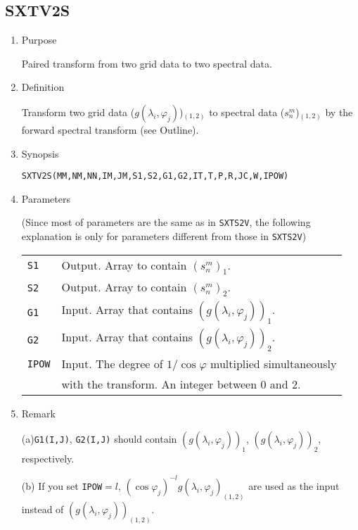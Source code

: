\documentclass[a4paper]{scrartcl}
\begin{document}

\subsection{SXTV2S}

\begin{enumerate}

\item Purpose

Paired transform from two grid data to two spectral data.
  
\item Definition

Transform two grid data ($g(\lambda_i,\varphi_j)$)$_{(1,2)}$ 
to spectral data ($s^m_n$)$_{(1,2)}$ 
by the forward spectral transform (see Outline).

\item Synopsis 

\texttt{SXTV2S(MM,NM,NN,IM,JM,S1,S2,G1,G2,IT,T,P,R,JC,W,IPOW)}
  

\item Parameters

(Since most of parameters are the same as in \texttt{SXTS2V},
the following explanation is only for parameters
different from those in \texttt{SXTS2V})

\begin{tabular}{ll}
\texttt{S1} & Output. Array to contain $(s^m_n)_1$.\\
\texttt{S2} & Output. Array to contain $(s^m_n)_2$.\\  
\texttt{G1} & Input. Array that 
contains $(g(\lambda_i,\varphi_j))_1$.\\
\texttt{G2} & Input. Array that 
contains $(g(\lambda_i,\varphi_j))_2$.\\
\texttt{IPOW} & Input. 
The degree of $1/\cos\varphi$ multiplied 
simultaneously  \\
&  with the transform. An integer between 0 and 2.
\end{tabular}

\item Remark

(a)\texttt{G1(I,J)}, \texttt{G2(I,J)}
  should contain
$(g(\lambda_i,\varphi_j))_1$, $(g(\lambda_i,\varphi_j))_2$, respectively.

(b) If you set \texttt{IPOW}$=l$, 
$(\cos\varphi_j)^{-l}g(\lambda_i,\varphi_j)_{(1,2)}$ are used as the input
instead of $(g(\lambda_i,\varphi_j))_{(1,2)}$.
  
\end{enumerate}
\end{document}
